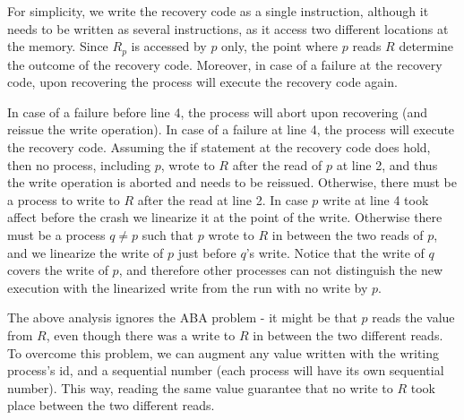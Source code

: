 \documentclass{article}
\begin{document}
For simplicity, we write the recovery code as a single instruction, although it needs to be written as several instructions, as it access two different locations at the memory. Since $R_p$ is accessed by $p$ only, the point where $p$ reads $R$ determine the outcome of the recovery code. Moreover, in case of a failure at the recovery code, upon recovering the process will execute the recovery code again.

In case of a failure before line 4, the process will abort upon recovering (and reissue the write operation). In case of a failure at line 4, the process will execute the recovery code. Assuming the if statement at the recovery code does hold, then no process, including $p$, wrote to $R$ after the read of $p$ at line 2, and thus the write operation is aborted and needs to be reissued. Otherwise, there must be a process to write to $R$ after the read at line 2. In case $p$ write at line 4 took affect before the crash  we linearize it at the point of the write. Otherwise there must be a process $q \neq p$ such that $p$ wrote to $R$ in between the two reads of $p$, and we linearize the write of $p$ just before $q$'s write. Notice that the write of $q$ covers the write of $p$, and therefore other processes can not distinguish the new execution with the linearized write from the run with no write by $p$.

The above analysis ignores the ABA problem - it might be that $p$ reads the value from $R$, even though there was a write to $R$ in between the two different reads. To overcome this problem, we can augment any value written with the writing process's id, and a sequential number (each process will have its own sequential number). This way, reading the same value guarantee that no write to $R$ took place between the two different reads.








\end{document}
